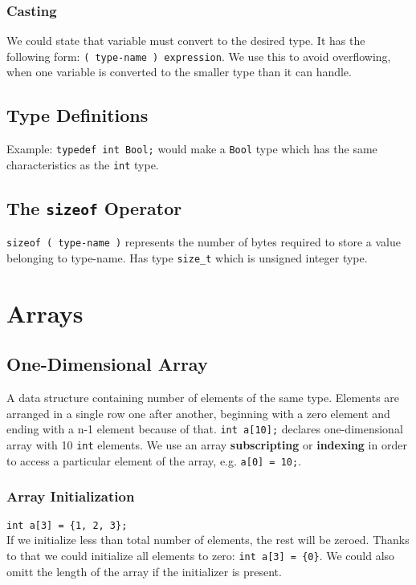 \documentclass[openany]{book}
\begin{document}
    \subsection*{Casting}
    We could state that variable must convert to the desired type. It has the following form: \texttt{( type-name ) expression}. We use this to avoid overflowing, when one variable is converted to the smaller type than it can handle.

    \section{Type Definitions}
    Example: \texttt{typedef int Bool;} would make a \texttt{Bool} type which has the same characteristics as the \texttt{int} type.

    \section{The \texttt{sizeof} Operator}
    \texttt{sizeof ( type-name )} represents the number of bytes required to store a value belonging to type-name. Has type \texttt{size\_t} which is unsigned integer type.



    \chapter{Arrays}

    \section{One-Dimensional Array}
    A data structure containing number of elements of the same type. Elements are arranged in a single row one after another, beginning with a zero element and ending with a n-1 element because of that. \texttt{int a[10];} declares one-dimensional array with 10 \texttt{int} elements. We use an array  \textbf{subscripting} or \textbf{indexing} in order to access a particular element of the array, e.g. \texttt{a[0] = 10;}.

    \subsection*{Array Initialization}
    \texttt{int a[3] = \{1, 2, 3\};} \\
    If we initialize less than total number of elements, the rest will be zeroed. Thanks to that we could initialize all elements to zero: \texttt{int a[3] = \{0\}}. We could also omitt the length of the array if the initializer is present.
\end{document}
